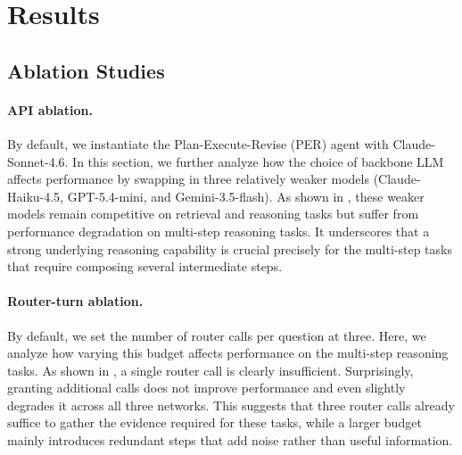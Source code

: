 \section{Results}
\label{sec:results}



\FloatBarrier

\FloatBarrier

\FloatBarrier

\FloatBarrier

\subsection{Ablation Studies}
\label{sec:ablations}



\paragraph{API ablation.}
By default, we instantiate the Plan-Execute-Revise (PER) agent with Claude-Sonnet-4.6. In this section, we further analyze how the choice of backbone LLM affects performance by swapping in three relatively weaker models (Claude-Haiku-4.5, GPT-5.4-mini, and Gemini-3.5-flash). As shown in , these weaker models remain competitive on retrieval and reasoning tasks but suffer from performance degradation on multi-step reasoning tasks. It underscores that a strong underlying reasoning capability is crucial precisely for the multi-step tasks that require composing several intermediate steps.

\FloatBarrier


\paragraph{Router-turn ablation.}
By default, we set the number of router calls per question at three. Here, we analyze how varying this budget affects performance on the multi-step reasoning tasks. As shown in , a single router call is clearly insufficient. Surprisingly, granting additional calls does not improve performance and even slightly degrades it across all three networks. This suggests that three router calls already suffice to gather the evidence required for these tasks, while a larger budget mainly introduces redundant steps that add noise rather than useful information.

\FloatBarrier
